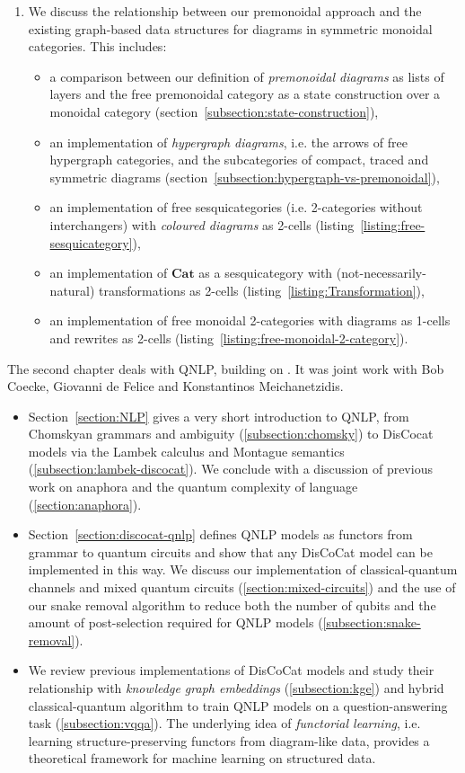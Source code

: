 \begin{enumerate}
\item We discuss the relationship between our premonoidal approach and the existing graph-based data structures for diagrams in symmetric monoidal categories.
This includes:
\begin{itemize}
\item a comparison between our definition of \emph{premonoidal diagrams} as lists of layers and the free premonoidal category as a state construction over a monoidal category (section~\ref{subsection:state-construction}),
\item an implementation of \emph{hypergraph diagrams}, i.e. the arrows of free hypergraph categories, and the subcategories of compact, traced and symmetric diagrams (section~\ref{subsection:hypergraph-vs-premonoidal}),
\item an implementation of free sesquicategories (i.e. 2-categories without interchangers) with \emph{coloured diagrams} as 2-cells (listing~\ref{listing:free-sesquicategory}),
\item an implementation of $\mathbf{Cat}$ as a sesquicategory with (not-necessarily-natural) transformations as 2-cells (listing~\ref{listing:Transformation}),
\item an implementation of free monoidal 2-categories with diagrams as 1-cells and rewrites as 2-cells (listing~\ref{listing:free-monoidal-2-category}).
\end{itemize}
\end{enumerate}
The second chapter deals with QNLP, building on \cite{MeichanetzidisEtAl20,CoeckeEtAl20,MeichanetzidisEtAl20a}.
It was joint work with Bob Coecke, Giovanni de Felice and Konstantinos Meichanetzidis.
\begin{itemize}
\item Section~\ref{section:NLP} gives a very short introduction to QNLP, from Chomskyan grammars and ambiguity (\ref{subsection:chomsky}) to DisCocat models via the Lambek calculus and Montague semantics (\ref{subsection:lambek-discocat}).
We conclude with a discussion of previous work on anaphora and the quantum complexity of language (\ref{section:anaphora}).
\item Section~\ref{section:discocat-qnlp} defines QNLP models as functors from grammar to quantum circuits and show that any DisCoCat model can be implemented in this way.
We discuss our implementation of classical-quantum channels and mixed quantum circuits (\ref{section:mixed-circuits}) and the use of our snake removal algorithm to reduce both the number of qubits and the amount of post-selection required for QNLP models (\ref{subsection:snake-removal}).
\item We review previous implementations of DisCoCat models and study their relationship with \emph{knowledge graph embeddings} (\ref{subsection:kge}) and  hybrid classical-quantum algorithm to train QNLP models on a question-answering task (\ref{subsection:vqqa}).
The underlying idea of \emph{functorial learning}, i.e. learning structure-preserving functors from diagram-like data, provides a theoretical framework for machine learning on structured data.
\end{itemize}
